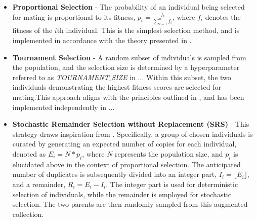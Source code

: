 \documentclass[10pt]{article}
\begin{document}
\begin{multicols}{2}
\begin{itemize}
    \item \textbf{Proportional Selection} - The probability of an individual being selected for mating is proportional to its fitness, $p_i = \frac{f_i}{\sum_{i=1}^{n} f_i}$, where $f_i$ denotes the fitness of the $i$th individual. This is the simplest selection method, and is implemented in accordance with the theory presented in \cite{parks2023geneticalgorithms}.
    \item \textbf{Tournament Selection} - A random subset of individuals is sampled from the population, and the selection size is determined by a hyperparameter referred to as \textit{TOURNAMENT$\_$SIZE} in ... Within this subset, the two individuals demonstrating the highest fitness scores are selected for mating.This approach aligns with the principles outlined in \cite{Miller1995GeneticAT}, and has been implemented independently in ...
    \item \textbf{Stochastic Remainder Selection without Replacement (SRS)} - This strategy draws inspiration from \cite{parks2023geneticalgorithms}. Specifically, a group of chosen individuals is curated by generating an expected number of copies for each individual, denoted as $E_i = N * p_i$, where $N$ represents the population size, and $p_i$ is elucidated above in the context of proportional selection. The anticipated number of duplicates is subsequently divided into an integer part, $I_i = \lfloor E_i \rfloor$, and a remainder, $R_i = E_i - I_i$. The integer part is used for deterministic selection of individuals, while the remainder is employed for stochastic selection. The two parents are then randomly sampled from this augmented collection.
\end{itemize}
\end{multicols}
\end{document}
